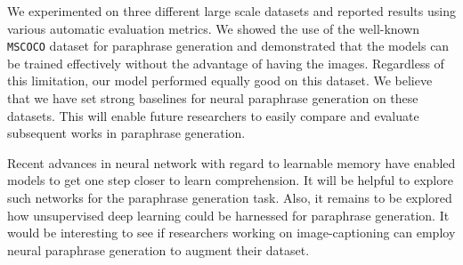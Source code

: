                                                 We experimented on three different large scale datasets and reported results using various automatic evaluation metrics. We showed the use of the well-known \texttt{MSCOCO} dataset for paraphrase generation and demonstrated that the models can be trained effectively without the advantage of having the images. Regardless of this limitation, our model performed equally good on this dataset. We believe that we have set strong baselines for neural paraphrase generation on these datasets. This will enable future researchers to easily compare and evaluate subsequent works in paraphrase generation.
       
                                                Recent advances in neural network with regard to learnable memory \cite{sukhbaatar2015end,ntmalex} have enabled models to get one step closer to learn comprehension. It will be helpful to explore such networks for the paraphrase generation task. Also, it remains to be explored how unsupervised deep learning could be harnessed for paraphrase generation. It would be interesting to see if researchers working on image-captioning can employ neural paraphrase generation to augment their dataset.
 
